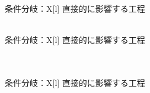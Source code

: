 \clearpage

\begin{multicollongtblr}{条件分岐：\PMEndFaceBoringExists}{X[l]}
直接的に影響する工程\\
\EndFaceBoringMilling\\
\end{multicollongtblr}

\begin{multicollongtblr}{条件分岐：\PMIncutBoringExists}{X[l]}
直接的に影響する工程\\
\IncutBoringMilling\\
\TopEndFaceInChamferMilling\\
\end{multicollongtblr}

\begin{multicollongtblr}{条件分岐：\PMCurvedOutcutExists}{X[l]}
直接的に影響する工程\\
\CurvedOutcutMilling\\
\EndFaceOutChamferMilling\\
\end{multicollongtblr}
